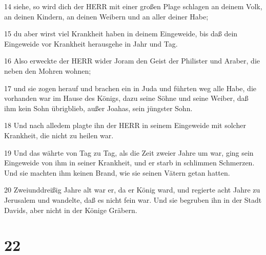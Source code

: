 \par 14 siehe, so wird dich der HERR mit einer großen Plage schlagen an deinem Volk, an deinen Kindern, an deinen Weibern und an aller deiner Habe;
\par 15 du aber wirst viel Krankheit haben in deinem Eingeweide, bis daß dein Eingeweide vor Krankheit herausgehe in Jahr und Tag.
\par 16 Also erweckte der HERR wider Joram den Geist der Philister und Araber, die neben den Mohren wohnen;
\par 17 und sie zogen herauf und brachen ein in Juda und führten weg alle Habe, die vorhanden war im Hause des Königs, dazu seine Söhne und seine Weiber, daß ihm kein Sohn übrigblieb, außer Joahas, sein jüngster Sohn.
\par 18 Und nach alledem plagte ihn der HERR in seinem Eingeweide mit solcher Krankheit, die nicht zu heilen war.
\par 19 Und das währte von Tag zu Tag, als die Zeit zweier Jahre um war, ging sein Eingeweide von ihm in seiner Krankheit, und er starb in schlimmen Schmerzen. Und sie machten ihm keinen Brand, wie sie seinen Vätern getan hatten.
\par 20 Zweiunddreißig Jahre alt war er, da er König ward, und regierte acht Jahre zu Jerusalem und wandelte, daß es nicht fein war. Und sie begruben ihn in der Stadt Davids, aber nicht in der Könige Gräbern.

\chapter{22}

